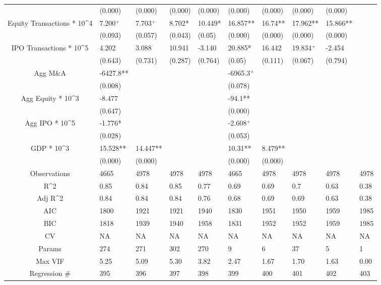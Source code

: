 \documentclass{article}
\begin{document}
\begin{table}[H]
\begin{tabular}{|clllllllll|}
   & (0.000) & (0.000) & (0.000) & (0.000) & (0.000) & (0.000) & (0.000) & (0.000) &  \\ 
  Equity Transactions * 10^4 & 7.200$^{+}$ & 7.703$^{+}$ & 8.702* & 10.449* & 16.857** & 16.74** & 17.962** & 15.866** &  \\ 
   & (0.093) & (0.057) & (0.043) & (0.05) & (0.000) & (0.000) & (0.000) & (0.000) &  \\ 
  IPO Transactions * 10^5 & 4.202 & 3.088 & 10.941 & -3.140 & 20.885* & 16.442 & 19.834$^{+}$ & -2.454 &  \\ 
   & (0.643) & (0.731) & (0.287) & (0.764) & (0.05) & (0.111) & (0.067) & (0.794) &  \\ 
  Agg M\&A & -6427.8** &  &  &  & -6965.3$^{+}$ &  &  &  &  \\ 
   & (0.008) &  &  &  & (0.078) &  &  &  &  \\ 
  Agg Equity * 10^3 & -8.477 &  &  &  & -94.1** &  &  &  &  \\ 
   & (0.647) &  &  &  & (0.000) &  &  &  &  \\ 
  Agg IPO * 10^5 & -1.776* &  &  &  & -2.608$^{+}$ &  &  &  &  \\ 
   & (0.028) &  &  &  & (0.053) &  &  &  &  \\ 
  GDP * 10^3 & 15.528** & 14.447** &  &  & 10.31** & 8.479** &  &  &  \\ 
   & (0.000) & (0.000) &  &  & (0.000) & (0.000) &  &  &  \\ 
  \hline 
 Observations & 4665 & 4978 & 4978 & 4978 & 4665 & 4978 & 4978 & 4978 & 4978 \\ 
  R^2 & 0.85 & 0.84 & 0.85 & 0.77 & 0.69 & 0.69 & 0.7 & 0.63 & 0.38 \\ 
  Adj R^2 & 0.84 & 0.84 & 0.84 & 0.76 & 0.68 & 0.69 & 0.69 & 0.63 & 0.38 \\ 
  AIC & 1800 & 1921 & 1921 & 1940 & 1830 & 1951 & 1950 & 1959 & 1985 \\ 
  BIC & 1818 & 1939 & 1940 & 1958 & 1831 & 1952 & 1952 & 1959 & 1985 \\ 
  CV & NA & NA & NA & NA & NA & NA & NA & NA & NA \\ 
  Params & 274 & 271 & 302 & 270 & 9 & 6 & 37 & 5 & 1 \\ 
  Max VIF & 5.25 & 5.09 & 5.30 & 3.82 & 2.47 & 1.67 & 1.70 & 1.63 & 0.00 \\ 
  Regression \# & 395 & 396 & 397 & 398 & 399 & 400 & 401 & 402 & 403 \\ 
   \hline
\end{tabular}
 
\end{table}
\end{document}
